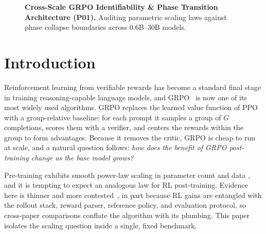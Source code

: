 \documentclass{article}
\begin{document}
\begin{figure}[htbp]
\centering
{}
\caption{\textbf{Cross-Scale GRPO Identifiability \& Phase Transition Architecture (P01).} Auditing parametric scaling laws against phase collapse boundaries across 0.6B--30B models.}
\label{fig:p1_scaling_identifiability}
\end{figure}
\section{Introduction}
\label{sec:p1-intro}
Reinforcement learning from verifiable rewards has become a standard final stage
in training reasoning-capable language models, and GRPO~\citep{shao2024deepseekmath, guo2025deepseekr1} is now one of its most widely used algorithms. GRPO replaces
the learned value function of PPO~\citep{schulman2017proximal} with a
group-relative baseline: for each prompt it samples a group of $G$ completions,
scores them with a verifier, and centers the rewards within the group to form
advantages. Because it removes the critic, GRPO is cheap to run at scale, and a
natural question follows: \emph{how does the benefit of GRPO post-training change
as the base model grows?}

Pre-training exhibits smooth power-law scaling in parameter count and data
\citep{kaplan2020scalinglaws, hoffmann2022chinchilla}, and it is tempting to expect
an analogous law for RL post-training. Evidence here is thinner and more
contested~\citep{hilton2023rlscaling, rafailov2024rlhfscaling, nimmaturi2025predictive},
in part because RL gains are entangled with the rollout stack, reward parser,
reference policy, and evaluation protocol, so cross-paper comparisons conflate the
algorithm with its plumbing. This paper isolates the scaling question inside a
single, fixed benchmark.
\end{document}
